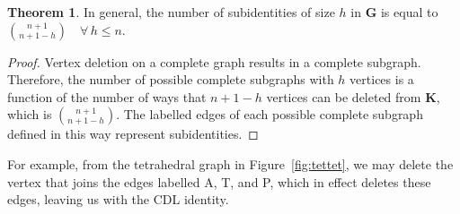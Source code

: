 \documentclass[12pt,oneside,a4paper]{article} %
\theoremstyle{definition}
\newtheorem{theorem}{Theorem}[section]
\begin{document}
\begin{appendices}
\begin{theorem}
In general, the number of subidentities of size $h$ in $\textbf{G}$ is equal to
$\binom{n+1}{n+1-h} \quad \forall \, h \le n$.
\end{theorem}

\begin{proof}
Vertex deletion on a complete graph results in a complete subgraph. Therefore,
the number of possible complete subgraphs with $h$ vertices is a function of the
number of ways that $n+1-h$ vertices can be deleted from $\textbf{K}$, which is
$\binom{n+1}{n+1-h}$. The labelled edges of each possible complete subgraph
defined in this way represent subidentities.
\end{proof}

For example, from the tetrahedral graph in Figure~\ref{fig:tettet}, we may
delete the vertex that joins the edges labelled A, T, and P, which in effect
deletes these edges, leaving us with the CDL identity. 

\end{appendices}
\end{document}
